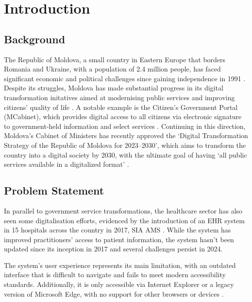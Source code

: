 
\chapter{Introduction}\label{chap:introduction}

\section{Background}

The Republic of Moldova, a small country in Eastern Europe that borders Romania and Ukraine, with a population of 2.4 million people, has faced significant economic and political challenges since gaining independence in 1991 \parencite{mdpop, mdpoverty}. Despite its struggles, Moldova has made substantial progress in its digital transformation initatives aimed at modernising public services and improving citizens' quality of life \parencite{mdega}. A notable example is the Citizen's Government Portal (MCabinet), which provides digital access to all citizens via electronic signature to government-held information and select services \parencite{mdcabinet}. Continuing in this direction, Moldova's Cabinet of Ministers has recently approved the `Digital Transformation Strategy of the Republic of Moldova for 2023--2030', which aims to transform the country into a digital society by 2030, with the ultimate goal of having `all public services available in a digitalized format' \parencite{mdstrategy}.

\section{Problem Statement}

In parallel to government service transformations, the healthcare sector has also seen some digitalisation efforts, evidenced by the introduction of an EHR system in 15 hospitals across the country in 2017, SIA AMS \parencite{mdehr}. While the system has improved practitioners' access to patient information, the system hasn't been updated since its inception in 2017 and several challenges persist in 2024.

The system's user experience represents its main limitation, with an outdated interface that is difficult to navigate and fails to meet modern accessibility standards. Additionally, it is only accessible via Internet Explorer or a legacy version of Microsoft Edge, with no support for other browsers or devices \parencite{mdehr}.


